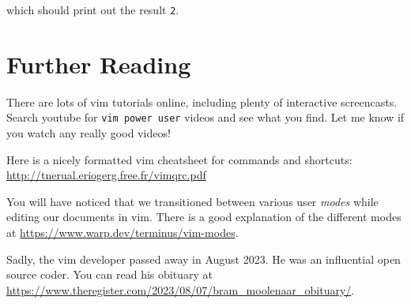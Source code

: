 \documentclass{article}
\begin{document}
which should print out the result \texttt{2}.

\section*{Further Reading}

There are lots of vim tutorials online, including plenty of interactive screencasts. Search youtube for \texttt{vim power user} videos and see what you find. Let me know if you watch any really good videos!

Here is a nicely formatted vim cheatsheet for commands and shortcuts:
\url{http://tnerual.eriogerg.free.fr/vimqrc.pdf}

You will have noticed that we transitioned between various
user \emph{modes} while editing our documents in vim. There is a
good explanation of the different modes at \url{https://www.warp.dev/terminus/vim-modes}.

Sadly, the vim developer passed away in August 2023. He was an influential open source coder. You can read his obituary at \url{https://www.theregister.com/2023/08/07/bram_moolenaar_obituary/}.
\end{document}
